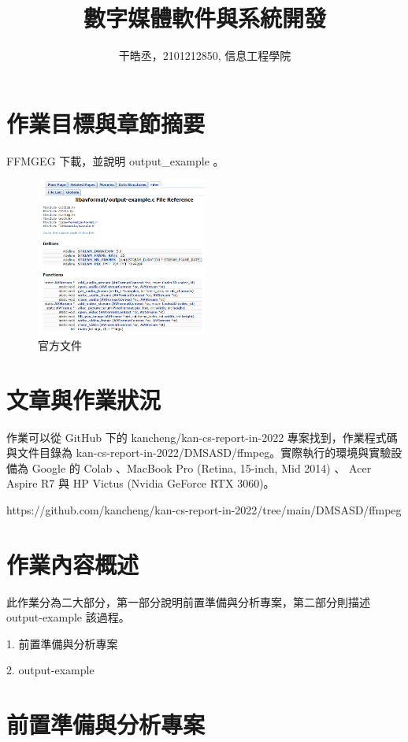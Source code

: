 \documentclass[10pt,UTF8]{ctexart}
\title{數字媒體軟件與系統開發}
\author{干皓丞，2101212850, 信息工程學院}
\begin{document}
\maketitle


\section{作業目標與章節摘要}

FFMGEG 下載，並說明 output\_example 。

\begin{figure}[H]
\centering 
\includegraphics[width=0.50\textwidth]{f1.png} 
\caption{官方文件}
\label{Test}
\end{figure}


\section{文章與作業狀況}

作業可以從 GitHub 下的 kancheng/kan-cs-report-in-2022 專案找到，作業程式碼與文件目錄為 kan-cs-report-in-2022/DMSASD/ffmpeg。實際執行的環境與實驗設備為 Google 的 Colab 、MacBook Pro (Retina, 15-inch, Mid 2014) 、 Acer Aspire R7 與 HP Victus (Nvidia GeForce RTX 3060)。

https://github.com/kancheng/kan-cs-report-in-2022/tree/main/DMSASD/ffmpeg

\section{作業內容概述}

此作業分為二大部分，第一部分說明前置準備與分析專案，第二部分則描述 output-example 該過程。

1. 前置準備與分析專案

2. output-example

\section{前置準備與分析專案}
\end{document}
